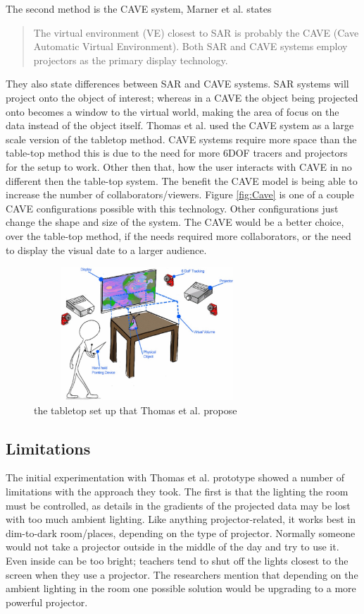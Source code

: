 \documentclass{sig-alternate}
\begin{document}
The second method is the CAVE system, Marner et al. states
\begin{quote}
	The virtual environment (VE) closest to SAR is probably the CAVE (Cave Automatic Virtual Environment). Both SAR and CAVE systems employ projectors as the primary display technology. \cite{CAVE}
\end{quote}
They also state differences between SAR and CAVE systems. SAR systems will project onto the object of interest; whereas in a CAVE the object being projected onto becomes a window to the virtual world, making the area of focus on the data instead of the object itself. Thomas et al. used the CAVE system as a large scale version of the tabletop method. CAVE systems require more space than the table-top method this is due to the need for more 6DOF tracers and projectors for the setup to work. Other then that, how the user interacts with CAVE in no different then the table-top system. The benefit the CAVE model is being able to increase the number of collaborators/viewers. Figure \ref{fig:Cave} is one of a couple CAVE configurations possible with this technology. Other configurations just change the shape and size of the system. The CAVE would be a better choice, over the table-top method, if the needs required more collaborators, or the need to display the visual date to a larger audience. 

\begin{figure}
	\includegraphics[width=8.5cm, height=5cm]{Tabletop}
	\caption{the tabletop set up that Thomas et al. propose \cite{3D}}
	\label{fig:Tabletop}
\end{figure}

\subsection{Limitations}
\label{sec:Limitations}
The initial experimentation with Thomas et al. \cite{3D} prototype showed a number of limitations with the approach they took. The first is that the lighting the room must be controlled, as details in the gradients of the projected data may be lost with too much ambient lighting. Like anything projector-related, it works best in dim-to-dark room/places, depending on the type of projector. Normally someone would not take a projector outside in the middle of the day and try to use it. Even inside can be too bright; teachers tend to shut off the lights closest to the screen when they use a projector. The researchers mention that depending on the ambient lighting in the room one possible solution would be upgrading to a more powerful projector.
\end{document}
